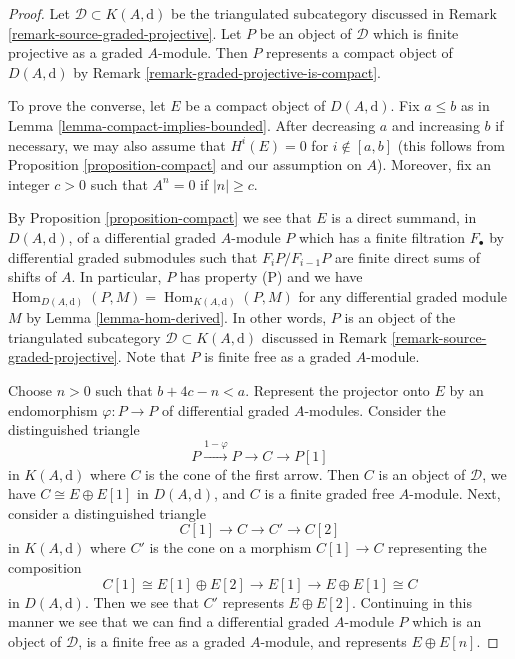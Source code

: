 \documentclass{stacks-project}
\theoremstyle{plain}
\theoremstyle{definition}
\theoremstyle{remark}
\numberwithin{equation}{subsection}
\def\Hom{\mathop{\mathrm{Hom}}\nolimits}
\begin{document}
\begin{proof}
Let $\mathcal{D} \subset K(A, \text{d})$ be the triangulated subcategory
discussed in Remark \ref{remark-source-graded-projective}.
Let $P$ be an object of $\mathcal{D}$ which is finite projective
as a graded $A$-module. Then $P$ represents a compact object of
$D(A, \text{d})$ by Remark \ref{remark-graded-projective-is-compact}.

\medskip\noindent
To prove the converse, let $E$ be a compact object of $D(A, \text{d})$.
Fix $a \leq b$ as in Lemma \ref{lemma-compact-implies-bounded}.
After decreasing $a$ and increasing $b$ if necessary, we may also
assume that $H^i(E) = 0$ for $i \not \in [a, b]$ (this follows
from Proposition \ref{proposition-compact} and our assumption on $A$).
Moreover, fix an integer $c > 0$ such that $A^n = 0$ if $|n| \geq c$.

\medskip\noindent
By Proposition \ref{proposition-compact} we see that $E$ is a direct
summand, in $D(A, \text{d})$, of a differential graded $A$-module $P$
which has a finite filtration $F_\bullet$ by differential
graded submodules such that $F_iP/F_{i - 1}P$ are finite direct sums
of shifts of $A$. In particular, $P$ has property (P) and we have
$\Hom_{D(A, \text{d})}(P, M) = \Hom_{K(A, \text{d})}(P, M)$ for any
differential graded module $M$ by Lemma \ref{lemma-hom-derived}.
In other words, $P$ is an object of the triangulated
subcategory $\mathcal{D} \subset K(A, \text{d})$ discussed in
Remark \ref{remark-source-graded-projective}.
Note that $P$ is finite free as a graded $A$-module.

\medskip\noindent
Choose $n > 0$ such that $b + 4c - n < a$.
Represent the projector onto $E$ by an endomorphism $\varphi : P \to P$ of
differential graded $A$-modules. Consider the distinguished triangle
$$
P \xrightarrow{1 - \varphi} P \to C \to P[1]
$$
in $K(A, \text{d})$ where $C$ is the cone of the first arrow. Then
$C$ is an object of $\mathcal{D}$,
we have $C \cong E \oplus E[1]$ in $D(A, \text{d})$, and
$C$ is a finite graded free $A$-module.
Next, consider a distinguished triangle
$$
C[1] \to C \to C' \to C[2]
$$
in $K(A, \text{d})$ where $C'$ is the cone on a morphism $C[1] \to C$
representing the composition
$$
C[1] \cong E[1] \oplus E[2] \to E[1] \to E \oplus E[1] \cong C
$$
in $D(A, \text{d})$. Then we see that $C'$ represents $E \oplus E[2]$.
Continuing in this manner we see that we can find a differential
graded $A$-module $P$ which is an object of $\mathcal{D}$,
is a finite free as a graded $A$-module, and represents $E \oplus E[n]$.


\end{proof}
\end{document}
